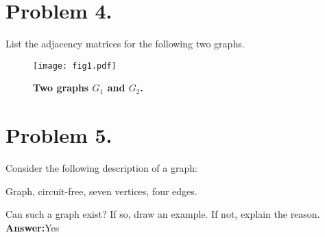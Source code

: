 \documentclass[11pt]{article}
\begin{document}
\section*{Problem 4.}

List the adjacency matrices for the following two graphs.
\newline

\begin{figure}[htbp]
\begin{center}
\texttt{[image: fig1.pdf]}
\end{center}
\label{fig1}
\caption{\bf Two graphs $G_1$ and $G_2$.}
\end{figure}
%
\newpage

\section*{Problem 5.}

Consider the following description of a graph:
\newline

  Graph, circuit-free, seven vertices, four edges.
\newline

\noindent
Can such a graph exist? If so, draw an example. If not, explain the reason.
\newline
\newline
\newline
\newline
{\bf Answer:}Yes
\end{document}
